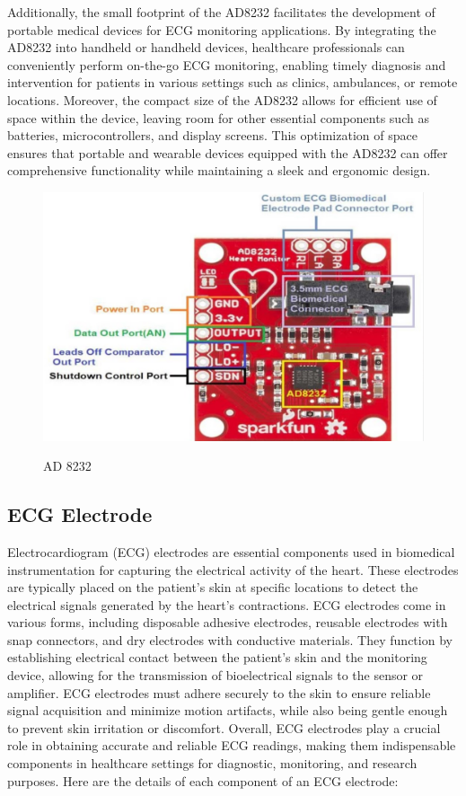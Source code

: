 Additionally, the small footprint of the AD8232 facilitates the development of portable medical devices for ECG monitoring\cite{serhani2020ecg} applications. By integrating the AD8232 into handheld or handheld devices, healthcare professionals can conveniently perform on-the-go ECG monitoring, enabling timely diagnosis and intervention for patients in various settings such as clinics, ambulances, or remote locations.
Moreover, the compact size of the AD8232 allows for efficient use of space within the device, leaving room for other essential components such as batteries, microcontrollers\cite{daisy2021early}, and display screens. This optimization of space ensures that portable and wearable devices equipped with the AD8232 can offer comprehensive functionality while maintaining a sleek and ergonomic design.



 \begin{figure}[htbp]
    \centering
     \includegraphics[width=0.7\linewidth]{C_chap/fig4.png}
\\\caption{ AD 8232}
 \end{figure}

\subsection{ECG Electrode}
Electrocardiogram (ECG) electrodes \cite{arquilla2020textile} are essential components used in biomedical instrumentation for capturing the electrical activity of the heart. These electrodes are typically placed on the patient's skin at specific locations to detect the electrical signals generated by the heart's contractions. ECG electrodes come in various forms, including disposable adhesive electrodes, reusable electrodes with snap connectors, and dry electrodes with conductive materials. They function by establishing electrical contact between the patient's skin and the monitoring device, allowing for the transmission of bioelectrical signals to the sensor or amplifier. ECG electrodes must adhere securely to the skin to ensure reliable signal acquisition and minimize motion artifacts, while also being gentle enough to prevent skin irritation or discomfort. Overall, ECG electrodes\cite{roh2014wearable} play a crucial role in obtaining accurate and reliable ECG readings, making them indispensable components in healthcare settings for diagnostic, monitoring, and research purposes. Here are the details of each component of an ECG electrode:

